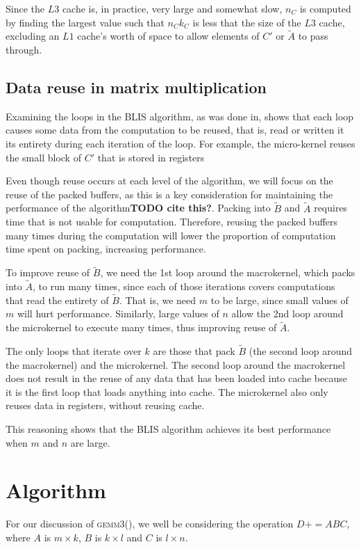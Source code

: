 \documentclass[12pt]{article}
\newcommand*{\pluseq}{\mathrel{{+}{=}}}
\newcommand*{\gemmt}{{\textsc{gemm3()}}}
\begin{document}
Since the $L3$ cache is, in practice, very large and somewhat slow, $n_C$ is computed by finding the largest value such that $n_Ck_C$ is less that the size of the $L3$ cache, excluding an $L1$ cache's worth of space to allow elements of $C'$ or $\tilde{A}$ to pass through.

\subsection{Data reuse in  matrix multiplication}
Examining the loops in the BLIS algorithm, as was done in\cite{Low2016}, shows that each loop causes some data from the computation to be reused, that is, read or written it its entirety during each iteration of the loop.
For example, the micro-kernel reuses the small block of $C'$ that is stored in registers

Even though reuse occurs at each level of the algorithm, we will focus on the reuse of the packed buffers, as this is a key consideration for maintaining the performance of the algorithm\textbf{TODO cite this?}.
Packing into $\tilde{B}$ and $\tilde{A}$ requires time that is not usable for computation.
Therefore, reusing the packed buffers many times during the computation will lower the proportion of computation time spent on packing, increasing performance.

To improve reuse of $\tilde{B}$, we need the 1st loop around the macrokernel, which packs into $\tilde{A}$, to run many times, since each of those iterations covers computations that read the entirety of $\tilde{B}$.
That is, we need $m$ to be large, since small values of $m$ will hurt performance.
Similarly, large values of $n$ allow the 2nd loop around the microkernel to execute many times, thus improving reuse of $\tilde{A}$.

The only loops that iterate over $k$ are those that pack $\tilde{B}$ (the second loop around the macrokernel) and the microkernel.
The second loop around the macrokernel does not result in the reuse of any data that has been loaded into cache because it is the first loop that loads anything into cache.
The microkernel also only reuses data in registers, without reusing cache.

This reasoning shows that the BLIS algorithm achieves its best performance when $m$ and $n$ are large.

\section{Algorithm}
For our discussion of \gemmt{}, we well be considering the operation $D \pluseq ABC$, where $A$ is $m \times k$, $B$ is $k \times l$ and $C$ is $l \times n$.
\end{document}
